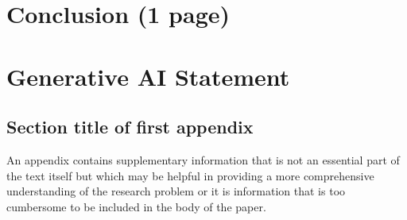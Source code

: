\documentclass[pdflatex,sn-mathphys-num, oneside]{sn-jnl}%
\theoremstyle{thmstyleone}%
\theoremstyle{thmstyletwo}%
\theoremstyle{thmstylethree}%
\begin{document}
\clearpage

\section{Conclusion (1 page)}\label{sec3}

\clearpage


\clearpage

\section{Generative AI Statement}

\clearpage

\begin{appendices}

\section{Section title of first appendix}\label{secA1}

An appendix contains supplementary information that is not an essential part of the text itself but which may be helpful in providing a more comprehensive understanding of the research problem or it is information that is too cumbersome to be included in the body of the paper.




\end{appendices}

\end{document}

